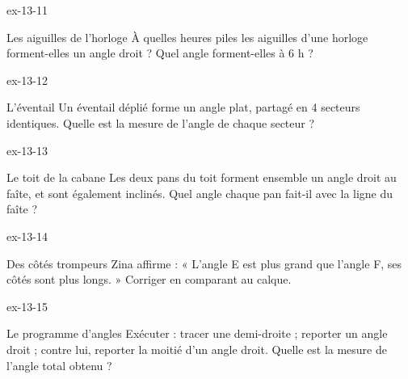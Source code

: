 \begin{blocLivre}{ex-13-11}\begin{exercice}[3]{Les aiguilles de l’horloge}
À quelles heures piles les aiguilles d’une horloge forment-elles un angle droit ? Quel angle forment-elles à 6 h ?
\label{fig-ex-13-11}
\end{exercice}\end{blocLivre}
\begin{blocLivre}{ex-13-12}\begin{exercice}[3]{L’éventail}
Un éventail déplié forme un angle plat, partagé en 4 secteurs identiques. Quelle est la mesure de l’angle de chaque secteur ?
\label{fig-ex-13-12}
\end{exercice}\end{blocLivre}
\begin{blocLivre}{ex-13-13}\begin{exercice}[3]{Le toit de la cabane}
Les deux pans du toit forment ensemble un angle droit au faîte, et sont également inclinés. Quel angle chaque pan fait-il avec la ligne du faîte ?
\label{fig-ex-13-13}
\end{exercice}\end{blocLivre}
\begin{blocLivre}{ex-13-14}\begin{exercice}[3]{Des côtés trompeurs}
Zina affirme : « L’angle E est plus grand que l’angle F, ses côtés sont plus longs. » Corriger en comparant au calque.
\label{fig-ex-13-14}
\end{exercice}\end{blocLivre}
\begin{blocLivre}{ex-13-15}\begin{exercice}[3]{Le programme d’angles}
Exécuter : tracer une demi-droite ; reporter un angle droit ; contre lui, reporter la moitié d’un angle droit. Quelle est la mesure de l’angle total obtenu ?
\label{fig-ex-13-15}
\end{exercice}\end{blocLivre}

\clearpage
